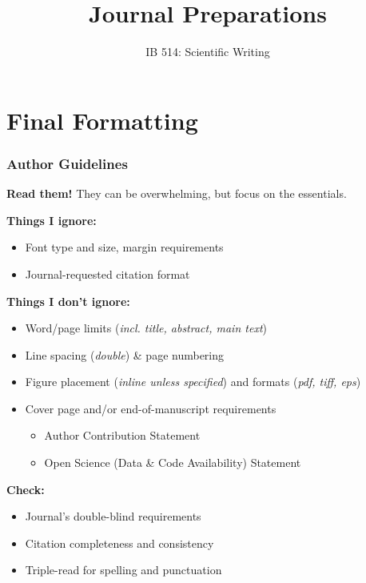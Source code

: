\documentclass{beamer}
\title{Journal Preparations}
\author[]{IB 514: Scientific Writing}
\date[]{}
\begin{document}
\begin{frame}
  \titlepage
\end{frame}


\section{Final Formatting}
\footnotesize
\begin{frame}
  \frametitle{Author Guidelines}

    \alert{\textbf{Read them!}}
    They can be overwhelming, but focus on the essentials.

    \medspace

    \textbf{Things I ignore:}
    \begin{itemize}
      \item Font type and size, margin requirements
      \item Journal-requested citation format
    \end{itemize}

    \textbf{Things I don't ignore:}
    \begin{itemize}
      \item Word/page limits (\textit{incl. title, abstract, main text})
      \item Line spacing (\textit{double}) \& page numbering
      \item Figure placement (\textit{inline unless specified}) and formats (\textit{pdf, tiff, eps})
    \item Cover page and/or end-of-manuscript requirements
    \begin{itemize}
      \scriptsize \item Author Contribution Statement
      \item Open Science (Data \& Code Availability) Statement
    \end{itemize}
    \end{itemize}

    \textbf{Check:}
    \begin{itemize}
    \item Journal's double-blind requirements
    \item Citation completeness and consistency
    \item Triple-read for spelling and punctuation
    \end{itemize}
\end{frame}
\end{document}
